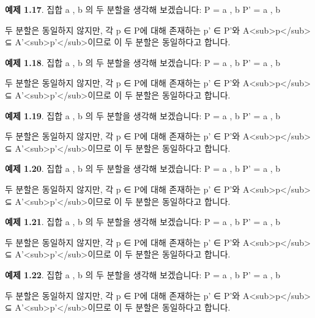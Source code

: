 \documentclass[11pt, a4paper, twoside, openany]{book}
\begin{document}
\par\medskip
\textbf{예제 1.17}. 집합 { a , b }의 두 분할을 생각해 보겠습니다:
P = { { a } , { b } }
P' = { { a , b } }

\par\medskip
두 분할은 동일하지 않지만, 각 p ∈ P\hspace{0pt}에 대해 존재하는 p' ∈ P'와 A<sub>p</sub> ⊆ A'<sub>p'</sub>이므로 이 두 분할은 동일하다고 합니다.

\par\medskip
\textbf{예제 1.18}. 집합 { a , b }의 두 분할을 생각해 보겠습니다:
P = { { a } , { b } }
P' = { { a , b } }

\par\medskip
두 분할은 동일하지 않지만, 각 p ∈ P\hspace{0pt}에 대해 존재하는 p' ∈ P'와 A<sub>p</sub> ⊆ A'<sub>p'</sub>이므로 이 두 분할은 동일하다고 합니다.

\par\medskip
\textbf{예제 1.19}. 집합 { a , b }의 두 분할을 생각해 보겠습니다:
P = { { a } , { b } }
P' = { { a , b } }

\par\medskip
두 분할은 동일하지 않지만, 각 p ∈ P\hspace{0pt}에 대해 존재하는 p' ∈ P'와 A<sub>p</sub> ⊆ A'<sub>p'</sub>이므로 이 두 분할은 동일하다고 합니다.

\par\medskip
\textbf{예제 1.20}. 집합 { a , b }의 두 분할을 생각해 보겠습니다:
P = { { a } , { b } }
P' = { { a , b } }

\par\medskip
두 분할은 동일하지 않지만, 각 p ∈ P\hspace{0pt}에 대해 존재하는 p' ∈ P'와 A<sub>p</sub> ⊆ A'<sub>p'</sub>이므로 이 두 분할은 동일하다고 합니다.

\par\medskip
\textbf{예제 1.21}. 집합 { a , b }의 두 분할을 생각해 보겠습니다:
P = { { a } , { b } }
P' = { { a , b } }

\par\medskip
두 분할은 동일하지 않지만, 각 p ∈ P\hspace{0pt}에 대해 존재하는 p' ∈ P'와 A<sub>p</sub> ⊆ A'<sub>p'</sub>이므로 이 두 분할은 동일하다고 합니다.

\par\medskip
\textbf{예제 1.22}. 집합 { a , b }의 두 분할을 생각해 보겠습니다:
P = { { a } , { b } }
P' = { { a , b } }

\par\medskip
두 분할은 동일하지 않지만, 각 p ∈ P\hspace{0pt}에 대해 존재하는 p' ∈ P'와 A<sub>p</sub> ⊆ A'<sub>p'</sub>이므로 이 두 분할은 동일하다고 합니다.
\end{document}
